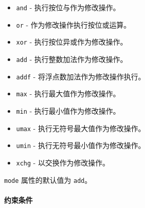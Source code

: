 \documentclass{article}
\begin{document}
\begin{itemize}
\item \texttt{and} - 执行按位与作为修改操作。
\item \texttt{or} - 作为修改操作执行按位或运算。
\item \texttt{xor} - 执行按位异或作为修改操作。
\item \texttt{add} - 执行整数加法作为修改操作。
\item \texttt{addf} - 将浮点数加法作为修改操作执行。
\item \texttt{max} - 执行最大值作为修改操作。
\item \texttt{min} - 执行最小值作为修改操作。
\item \texttt{umax} - 执行无符号最大值作为修改操作。
\item \texttt{umin} - 执行无符号最小值作为修改操作。
\item \texttt{xchg} - 以交换作为修改操作。


\end{itemize}
\texttt{mode} 属性的默认值为 \texttt{add}。





\paragraph{约束条件}
\end{document}
